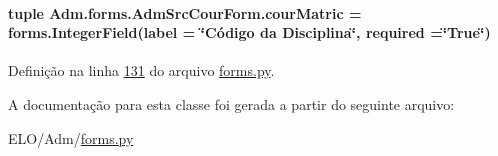 \paragraph[{cour\+Matric}]{\setlength{\rightskip}{0pt plus 5cm}tuple Adm.\+forms.\+Adm\+Src\+Cour\+Form.\+cour\+Matric = forms.\+Integer\+Field(label = \char`\"{}Código da Disciplina\char`\"{}, required =\char`\"{}True\char`\"{})\hspace{0.3cm}{\ttfamily [static]}}\label{classAdm_1_1forms_1_1AdmSrcCourForm_ad1687195ebe49268ac1cccbcaab2cd83}


Definição na linha \hyperlink{Adm_2forms_8py_source_l00131}{131} do arquivo \hyperlink{Adm_2forms_8py_source}{forms.\+py}.



A documentação para esta classe foi gerada a partir do seguinte arquivo\+:\begin{DoxyCompactItemize}
\item 
E\+L\+O/\+Adm/\hyperlink{Adm_2forms_8py}{forms.\+py}\end{DoxyCompactItemize}

